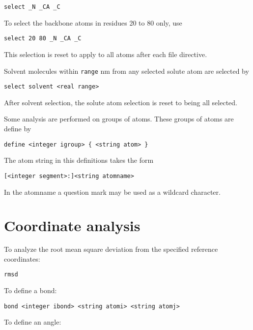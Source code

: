 \begin{verbatim}
select _N _CA _C
\end{verbatim}

To select the backbone atoms in residues 20 to 80 only, use

\begin{verbatim}
select 20 80 _N _CA _C
\end{verbatim}

This selection is reset to apply to all atoms after each file
directive.

Solvent molecules within \verb+range+ nm from any selected solute atom
are selected by

\begin{verbatim}
select solvent <real range>
\end{verbatim}

After solvent selection, the solute atom selection is reset to being all
selected.

\par

Some analysis are performed on groups of atoms. These groups of atoms
are define by

\begin{verbatim}
define <integer igroup> { <string atom> }
\end{verbatim}

The atom string in this definitions takes the form

\begin{verbatim}
[<integer segment>:]<string atomname>
\end{verbatim}

In the atomname a question mark may be used as a wildcard character.

\section{Coordinate analysis}

To analyze the root mean square deviation from the specified reference
coordinates:

\begin{verbatim}
rmsd
\end{verbatim}

To define a bond:

\begin{verbatim}
bond <integer ibond> <string atomi> <string atomj> 
\end{verbatim}

To define an angle:

